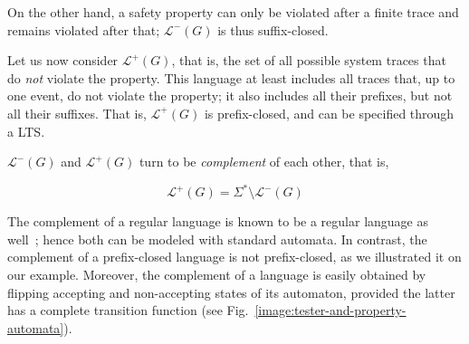 On the other hand, a safety property can only be violated after a finite trace and remains violated after that; $\mathcal{L}^{-}(G)$ is thus suffix-closed. 

Let us now consider $\mathcal{L}^{+}(G)$, that is, the set of all possible system traces that do \emph{not} violate the property. This language at least includes all traces that, up to one event, do not violate the property; it also includes all their prefixes, but not all their suffixes. That is, $\mathcal{L}^{+}(G)$ is prefix-closed, and can be specified through a LTS. 

$\mathcal{L}^{-}(G)$ and $\mathcal{L}^{+}(G)$ turn to be \emph{complement} of each other, that is, 

\begin{equation}
\mathcal{L}^{+}(G) = \Sigma^{*} \setminus \mathcal{L}^{-}(G)
\end{equation}

The complement of a regular language is known to be a regular language as well~\cite{Hopcroft:1979}; hence both can be modeled with standard automata. In contrast, the complement of a prefix-closed language is not prefix-closed, as we illustrated it on our example. Moreover, the complement of a language is easily obtained by flipping accepting and non-accepting states of its automaton, provided the latter has a complete transition function (see Fig.~\ref{image:tester-and-property-automata}). 

